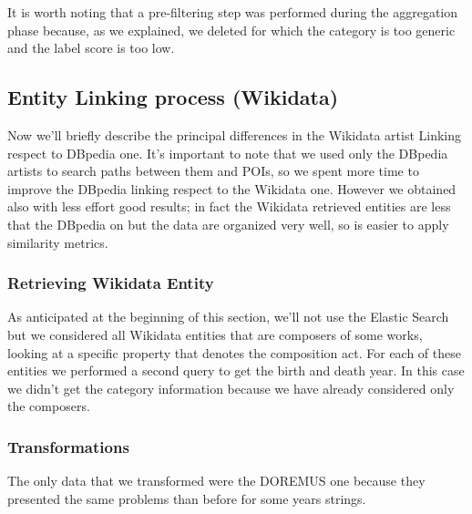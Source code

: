 \documentclass[paper=a4, fontsize=11pt]{scrartcl}
\begin{document}
It is worth noting that a pre-filtering step was performed during the aggregation phase because, as we explained, we deleted for which the category is too generic and the label score is too low.

\subsection{Entity Linking process (Wikidata)}

Now we'll briefly describe the principal differences in the Wikidata artist Linking respect to DBpedia one. It's important to note that we used only the DBpedia artists to search paths between them and POIs, so we spent more time to improve the DBpedia linking respect to the Wikidata one. However we obtained also with less effort good results; in fact the Wikidata retrieved entities are less that the DBpedia on but the data are organized very well, so is easier to apply similarity metrics.


\subsubsection{Retrieving Wikidata Entity}
As anticipated at the beginning of this section, we'll not use the Elastic Search but we considered all Wikidata entities that are composers of some works, looking at a specific property that denotes the composition act. For each of these entities we performed a second query to get the birth and death year. In this case we didn't get the category information because we have already considered only the composers.

\subsubsection{Transformations}
The only data that we transformed were the DOREMUS one because they presented the same problems than before for some years strings.
\end{document}
